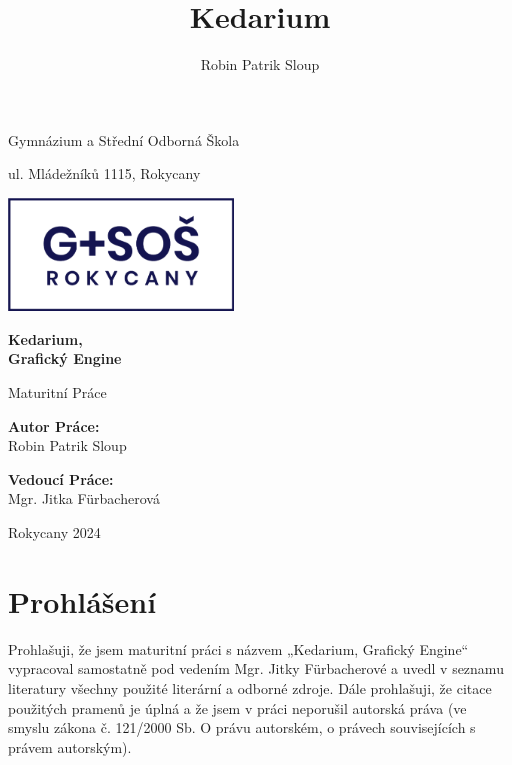 \documentclass[12pt]{article}
\title{Kedarium}
\author{Robin Patrik Sloup}
\begin{document}
\begin{titlepage}
	\begin{center}
		{\Large Gymnázium a Střední Odborná Škola\par}
		ul. Mládežníků 1115, Rokycany
	\end{center}
	\begin{center}
		\vspace{1cm}
		\includegraphics[height=3cm]{school-logo.png}\\
	\end{center}
	\vspace*{\fill}
	\begin{center}
		{\Huge \textbf{Kedarium,\\Grafický Engine}\par}
		\vspace{0.3cm}
		{\Large Maturitní Práce\par}
		\vspace{1.5cm}
	\end{center}
	\vspace*{\fill}
	\begin{center}
		\begin{minipage}[t]{0.45\textwidth}
			\centering
			\textbf{Autor Práce:}\\
			Robin Patrik Sloup
		\end{minipage}%
		\begin{minipage}[t]{0.45\textwidth}
			\centering
			\textbf{Vedoucí Práce:}\\
			Mgr. Jitka Fürbacherová
		\end{minipage}
	\end{center}
	\vspace{2cm}
	\begin{center}
		Rokycany 2024
	\end{center}
	\thispagestyle{empty}
\end{titlepage}
\setcounter{page}{2}
\section*{Prohlášení}
Prohlašuji, že jsem maturitní práci s názvem „Kedarium, Grafický Engine“ vypracoval samostatně pod vedením Mgr. Jitky Fürbacherové a uvedl v seznamu literatury všechny použité literární a odborné
zdroje. Dále prohlašuji, že citace použitých pramenů je úplná a že jsem v práci neporušil
autorská práva (ve smyslu zákona č. 121/2000 Sb. O právu autorském, o právech souvisejících
s právem autorským).
\end{document}
